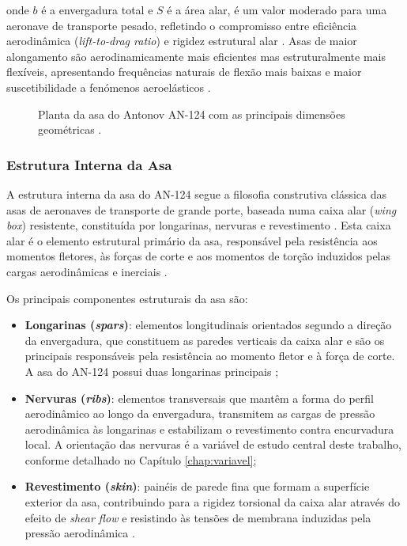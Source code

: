 \documentclass[a4paper,fleqn,noprintline]{cas-dc}
\begin{document}
\noindent onde $b$ é a envergadura total e $S$ é a área alar, é um valor moderado para uma aeronave de transporte pesado, refletindo o compromisso entre eficiência aerodinâmica (\textit{lift-to-drag ratio}) e rigidez estrutural alar \cite{Raymer2018}. Asas de maior alongamento são aerodinamicamente mais eficientes mas estruturalmente mais flexíveis, apresentando frequências naturais de flexão mais baixas e maior suscetibilidade a fenómenos aeroelásticos \cite{Wright2015}.

\begin{figure}[h!]
    \centering
    \caption{Planta da asa do Antonov AN-124 com as principais 
    dimensões geométricas \cite{GarciaFernandez2025}.}
    \label{fig:an124_asa_planta}
\end{figure}

\subsubsection{Estrutura Interna da Asa}

A estrutura interna da asa do AN-124 segue a filosofia construtiva clássica das asas de aeronaves de transporte de grande porte, baseada numa caixa alar (\textit{wing box}) resistente, constituída por longarinas, nervuras e revestimento \cite{Niu1988, Megson2012}. Esta caixa alar é o elemento estrutural primário da asa, responsável pela resistência aos momentos fletores, às forças de corte e aos momentos de torção induzidos pelas cargas aerodinâmicas e inerciais \cite{Megson2012}.

Os principais componentes estruturais da asa são:

\begin{itemize}
    \item \textbf{Longarinas (\textit{spars})}: elementos longitudinais orientados segundo a direção da envergadura, que constituem as paredes verticais da caixa alar e são os principais responsáveis pela resistência ao momento fletor e à força de corte. A asa do AN-124 possui duas longarinas principais \cite{GarciaFernandez2025};

    \item \textbf{Nervuras (\textit{ribs})}: elementos transversais que mantêm a forma do perfil aerodinâmico ao longo da envergadura, transmitem as cargas de pressão aerodinâmica às longarinas e estabilizam o revestimento contra encurvadura local. A orientação das nervuras é a variável de estudo central deste trabalho, conforme detalhado no Capítulo \ref{chap:variavel};

    \item \textbf{Revestimento (\textit{skin})}: painéis de parede fina que formam a superfície exterior da asa, contribuindo para a rigidez torsional da caixa alar através do efeito de \textit{shear flow} e resistindo às tensões de membrana induzidas pela pressão aerodinâmica \cite{Megson2012}.
\end{itemize}
\end{document}
